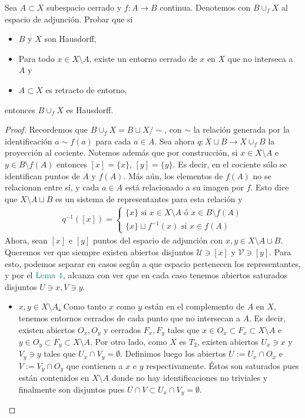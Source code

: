 \documentclass[11pt]{article}
\newcommand{\paint}[2]{\color{#1}{#2}}
\newenvironment{exercise}[2][Ejercicio]{\begin{trivlist}
\item[\hskip \labelsep \paint{grey-light-blue}{{\bfseries #1}}\hskip \labelsep {\bfseries #2.}]}{\end{trivlist}}
\begin{document}
\begin{exercise}{5} Sea $A \subset X$ subespacio cerrado y $f : A \to B$ continua. Denotemos con $B \cup_f X$ al espacio de
adjunci\'on. Probar que si
\begin{itemize}
\item $B$ y $X$ son Hausdorff,
\item Para todo $x \in X \setminus A$, existe un entorno cerrado de $x$ en $X$ que no interseca a $A$ y
\item $A \subset X$ es retracto de entorno,
\end{itemize}
entonces $B \cup_f X$ es Hausdorff.
\end{exercise}
\begin{proof} Recordemos que $B \cup_f X = B \sqcup X / \sim$, con $\sim$ la relaci\'on generada por la identificaci\'on $a \sim f(a)$ para cada $a \in A$. Sea ahora $q : X \sqcup B \to X \cup_f B$ la proyecci\'on al cociente. Notemos adem\'as que por construcci\'on, si $x \in X \setminus A$ e $y \in B \setminus f(A)$ entonces $[x] = \{x\}$, $[y] = \{y\}$. Es decir, en el cociente s\'olo se identifican puntos de $A$ y $f(A)$. M\'as a\'un, los elementos de $f(A)$ no se relacionan entre s\'i, y cada $a \in A$ est\'a relacionado a su imagen por $f$. Esto dice que $X \setminus A \sqcup B$ es un sistema de representantes para esta relaci\'on y
\begin{align*}
q^{-1}([x]) = \begin{cases}
\{x\} \text{ si $x \in X \setminus A$ \'o $x \in B \setminus f(A)$} \\
\{x\} \sqcup f^{-1}(x) \text{ si $x \in f(A)$}
\end{cases}
\end{align*}
Ahora, sean $[x]$ e $[y]$ puntos del espacio de adjunci\'on con $x,y \in X \setminus A \sqcup B$. Queremos ver que siempre existen abiertos disjuntos $\mathcal{U} \ni [x]$ y $\mathcal{V} \ni [y]$. Para esto, podemos separar en casos seg\'un a que espacio pertenecen los representantes, y por el $\paint{grey-light-blue}{\text{Lema }4}$, alcanza con ver que en cada caso tenemos abiertos saturados disjuntos $U \ni x, V\ni y$.
\begin{itemize}
\item \underline{\textbf{\paint{grey-light-blue}{\text{Caso $1$:}}} $x,y \in X \setminus A$.} Como tanto $x$ como $y$ est\'an en el complemento de $A$ en $X$, tenemos entornos cerrados de cada punto que no intersecan a $A$. Es decir, existen abiertos $O_x,O_y$ y cerrados $F_x,F_y$ tales que $x \in O_x \subset F_x \subset X \setminus A$ e $y \in O_y \subset F_y \subset X \setminus A$. Por otro lado, como $X$ es $T_2$, existen abiertos $U_x \ni x$ y $V_y \ni y$ tales que $U_x \cap V_y = \emptyset$. Definimos luego los abiertos $U := U_x \cap O_x$ e $V := V_y \cap O_y$ que contienen a $x$ e $y$ respectivamente. \'Estos son saturados pues est\'an contenidos en $X \setminus A$ donde no hay identificaciones no triviales y finalmente son disjuntos pues $U \cap V \subset U_x \cap V_y = \emptyset$.

\end{itemize}
\end{proof}
\end{document}
